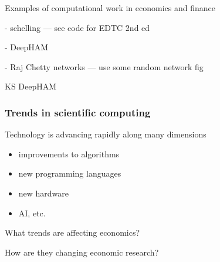 \documentclass[
    xcolor={svgnames,dvipsnames},
    hyperref={colorlinks, citecolor=DeepPink4, linkcolor=DarkRed, urlcolor=DarkBlue}
    ]{beamer}  %
\newcommand{\1}{\mathbbm 1}
\begin{document}
\begin{frame}
    
    Examples of computational work in economics and finance

    - schelling  --- see code for EDTC 2nd ed

    - DeepHAM

    - Raj Chetty networks --- use some random network fig

\end{frame}


\begin{frame}

    KS DeepHAM
    
    \begin{figure}
        \centering
    \end{figure}

\end{frame}

\begin{frame}
    \frametitle{Trends in scientific computing}

    Technology is advancing rapidly along many dimensions
    \begin{itemize}
        \item improvements to algorithms
    \vspace{0.3em}
        \item new programming languages
    \vspace{0.3em}
        \item new hardware
    \vspace{0.3em}
        \item AI, etc.
    \end{itemize}

    \vspace{0.3em}
    \vspace{0.3em}
    What trends are affecting economics?

    \vspace{0.3em}
    \vspace{0.3em}
    How are they changing economic research?

\end{frame}
\end{document}
